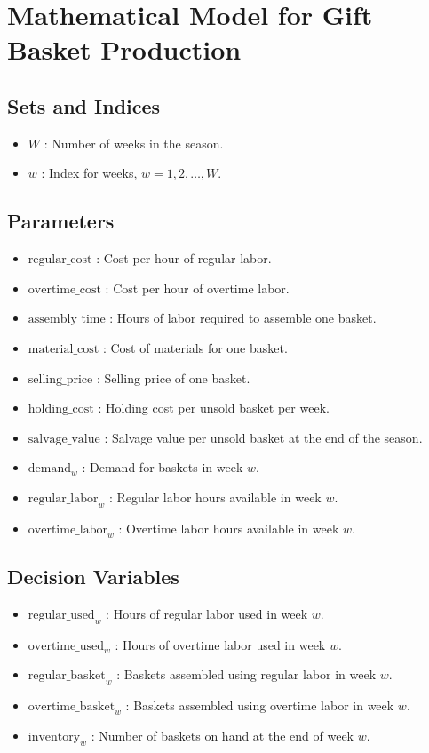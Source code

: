 \documentclass{article}
\begin{document}
\section*{Mathematical Model for Gift Basket Production}

\subsection*{Sets and Indices}
\begin{itemize}
    \item \( W \) : Number of weeks in the season.
    \item \( w \) : Index for weeks, \( w = 1, 2, \ldots, W \).
\end{itemize}

\subsection*{Parameters}
\begin{itemize}
    \item \( \text{regular\_cost} \) : Cost per hour of regular labor.
    \item \( \text{overtime\_cost} \) : Cost per hour of overtime labor.
    \item \( \text{assembly\_time} \) : Hours of labor required to assemble one basket.
    \item \( \text{material\_cost} \) : Cost of materials for one basket.
    \item \( \text{selling\_price} \) : Selling price of one basket.
    \item \( \text{holding\_cost} \) : Holding cost per unsold basket per week.
    \item \( \text{salvage\_value} \) : Salvage value per unsold basket at the end of the season.
    \item \( \text{demand}_w \) : Demand for baskets in week \( w \).
    \item \( \text{regular\_labor}_w \) : Regular labor hours available in week \( w \).
    \item \( \text{overtime\_labor}_w \) : Overtime labor hours available in week \( w \).
\end{itemize}

\subsection*{Decision Variables}
\begin{itemize}
    \item \( \text{regular\_used}_w \) : Hours of regular labor used in week \( w \).
    \item \( \text{overtime\_used}_w \) : Hours of overtime labor used in week \( w \).
    \item \( \text{regular\_basket}_w \) : Baskets assembled using regular labor in week \( w \).
    \item \( \text{overtime\_basket}_w \) : Baskets assembled using overtime labor in week \( w \).
    \item \( \text{inventory}_w \) : Number of baskets on hand at the end of week \( w \).
\end{itemize}
\end{document}
